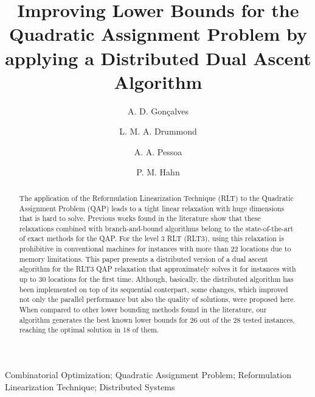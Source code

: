 \documentclass[authoryear,12pt,a4paper,times]{elsarticle}
\begin{document}
\begin{frontmatter}



\title{Improving Lower Bounds for the Quadratic Assignment Problem by  applying a  Distributed Dual Ascent Algorithm}

\author[adg]{A. D. Gon\c calves}

\author[adg]{L. M. A. Drummond }

\author[aap]{A. A. Pessoa}

\author[pmh]{P. M. Hahn}




\address[adg]{Computer Science Department, Fluminense Federal University, Niter\'{o}i, RJ, Brazil}

\address[aap]{Production Engineering Department, Fluminense Federal University, Niter\'{o}i - RJ, Brazil}

\address[pmh]{Electrical and Systems Engineering, The University of Pennsylvania, Philadelphia, PA 19104-6315, USA}



\begin{abstract}
The application of the Reformulation Linearization Technique (RLT) to the Quadratic Assignment Problem (QAP) leads to a tight linear relaxation
with huge dimensions that is hard to solve.
Previous works found in the literature show that these relaxations combined with branch-and-bound algorithms belong to the state-of-the-art
of exact methods for the QAP. 
For the level 3 RLT (RLT3), using this relaxation is prohibitive in conventional machines for instances with more than 22 locations
due to memory limitations.
This paper presents a distributed version of a dual ascent algorithm for the RLT3 QAP relaxation that approximately solves it for instances
with up to 30 locations for the first time. Although, basically, the  distributed algorithm
has been  implemented on top of its  sequential conterpart, some changes,
 which improved not only the parallel performance
but  also the quality of solutions, were proposed here.
When compared to other lower bounding methods found in the literature, our algorithm generates the best known lower bounds for 26 out of the
28 tested instances, reaching the optimal solution in 18 of them.
\end{abstract}


\begin{keyword}
Combinatorial Optimization; Quadratic Assignment Problem; Reformulation Linearization Technique; Distributed Systems

\end{keyword}

\end{frontmatter}
\end{document}
